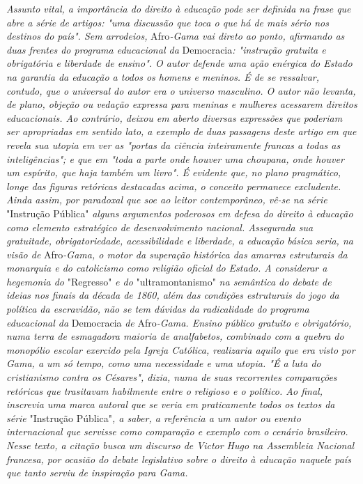 \emph{Assunto vital, a importância do direito à educação pode ser
definida na frase que abre a série de artigos: "uma discussão que toca o
que há de mais sério nos destinos do país". Sem arrodeios,}
Afro\emph{-Gama vai direto ao ponto, afirmando as duas frentes do
programa educacional da} Democracia\emph{: "instrução gratuita e
obrigatória e liberdade de ensino". O autor defende uma ação enérgica do
Estado na garantia da educação a todos os homens e meninos. É de se
ressalvar, contudo, que o universal do autor era o universo masculino. O
autor não levanta, de plano, objeção ou vedação expressa para meninas e
mulheres acessarem direitos educacionais. Ao contrário, deixou em aberto
diversas expressões que poderiam ser apropriadas em sentido lato, a
exemplo de duas passagens deste artigo em que revela sua utopia em ver
as "portas da ciência inteiramente francas a todas as inteligências"; e
que em "toda a parte onde houver uma choupana, onde houver um espírito,
que haja também um livro". É evidente que, no plano pragmático, longe
das figuras retóricas destacadas acima, o conceito permanece excludente.
Ainda assim, por paradoxal que soe ao leitor contemporâneo, vê-se na
série} "Instrução Pública" \emph{alguns argumentos poderosos em defesa
do direito à educação como elemento estratégico de desenvolvimento
nacional. Assegurada sua gratuitade, obrigatoriedade, acessibilidade e
liberdade, a educação básica seria, na visão de} Afro\emph{-Gama, o
motor da superação histórica das amarras estruturais da monarquia e do
catolicismo como religião oficial do Estado. A considerar a hegemonia
do} "Regresso" \emph{e do} "ultramontanismo" \emph{na semântica do
debate de ideias nos finais da década de 1860, além das condições
estruturais do jogo da política da escravidão, não se tem dúvidas da
radicalidade do programa educacional da} Democracia \emph{de}
Afro\emph{-Gama. Ensino público gratuito e obrigatório, numa terra de
esmagadora maioria de analfabetos, combinado com a quebra do monopólio
escolar exercido pela Igreja Católica, realizaria aquilo que era visto
por Gama, a um só tempo, como uma necessidade e uma utopia. "É a luta do
cristianismo contra os Césares", dizia, numa de suas recorrentes
comparações retóricas que trasitavam habilmente entre o religioso e o
político. Ao final, inscrevia uma marca autoral que se veria em
praticamente todos os textos da série} "Instrução Pública"\emph{, a
saber, a referência a um autor ou evento internacional que servisse como
comparação e exemplo com o cenário brasileiro. Nesse texto, a citação
busca um discurso de Victor Hugo na Assembleia Nacional francesa, por
ocasião do debate legislativo sobre o direito à educação naquele país
que tanto serviu de inspiração para Gama.}

